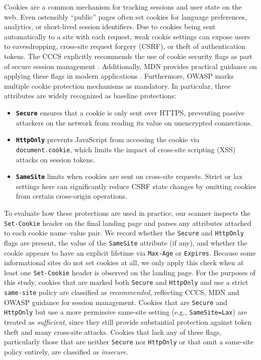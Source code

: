 \documentclass[pdflatex,sn-mathphys-num]{sn-jnl}
\numberwithin{equation}{section}
\theoremstyle{thmstyleone}
\theoremstyle{thmstyletwo}%
\theoremstyle{thmstylethree}%
\begin{document}
\vspace{1em}Cookies are a common mechanism for tracking sessions and user state on the web. 
Even ostensibly ``public'' pages often set cookies for language preferences, analytics, or short-lived 
session identifiers. Due to cookies being sent automatically to a site with each request, weak cookie settings can expose
users to eavesdropping, cross-site request forgery (CSRF), or theft of authentication tokens. The CCCS 
explicitly recommends the use of cookie security flags as part of secure session
management \cite{cccs_itsp_40_111}. Additionally, MDN provides practical guidance on applying these flags in modern 
applications \cite{mdn_secure_cookie_configuration}. Furthermore, OWASP marks multiple cookie protection mechanisms as mandatory.
In particular, three attributes are widely recognized as baseline protections:
\begin{itemize}
  \item \textbf{\texttt{Secure}} ensures that a cookie is only sent over HTTPS, preventing passive attackers on the network from reading its value on unencrypted connections.
  \item \textbf{\texttt{HttpOnly}} prevents JavaScript from accessing the cookie via \texttt{document.cookie}, which limits the impact of cross-site scripting (XSS) attacks on session tokens.
  \item \textbf{\texttt{SameSite}} limits when cookies are sent on cross-site requests. Strict or lax settings here can significantly reduce CSRF state changes by omitting cookies from certain cross-origin operations.
\end{itemize}

To evaluate how these protections are used in practice, our scanner inspects the \texttt{Set-Cookie} header on the final 
landing page and parses any attributes attached to each cookie name–value pair. We record whether the \texttt{Secure} and 
\texttt{HttpOnly} flags are present, the value of the \texttt{SameSite} attribute (if any), and whether
 the cookie appears to have an explicit lifetime via \texttt{Max-Age} or \texttt{Expires}. 
Because some informational sites do not set 
cookies at all, we only apply this check when at least one \texttt{Set-Cookie} header is observed on the 
landing page. For the purposes of this study, cookies that are marked both \texttt{Secure} and \texttt{HttpOnly} and use a 
strict
\texttt{same-site} policy are classified as \emph{recommended}, 
reflecting CCCS, MDN and OWASP guidance for session management. 
Cookies that are \texttt{Secure} and \texttt{HttpOnly} but use a more permissive same-site setting 
(e.g., \texttt{SameSite=Lax}) are treated as \emph{sufficient}, 
since they still provide substantial protection against token theft and many cross-site attacks. 
Cookies that lack any of these flags, particularly those that are neither \texttt{Secure} nor \texttt{HttpOnly} 
or that omit a same-site policy entirely, are classified as \emph{insecure}. 
\end{document}
